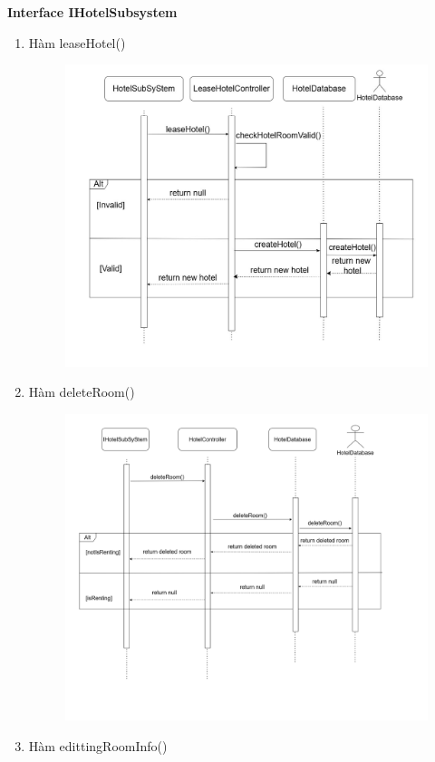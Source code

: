 \textbf{Interface IHotelSubsystem}
    \begin{enumerate}
        \item Hàm leaseHotel()
        \begin{figure}[H]
        \centering
        \includegraphics[width=0.8\linewidth]{img3.5/hotel/leaseHotel.jpg} 
        \end{figure}
        \item Hàm deleteRoom()
        \begin{figure}[H]
        \centering
        \includegraphics[width=0.8\linewidth]{img3.5/hotel/deleteRoom.png} 
        \end{figure}
        \item Hàm edittingRoomInfo()
        \begin{figure}[H]
        \centering

\end{figure}
\end{enumerate}
